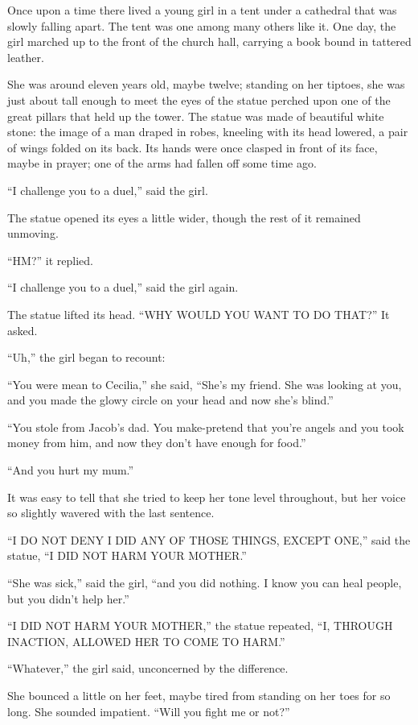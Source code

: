 Once upon a time there lived a young girl in a tent under a cathedral that was slowly falling apart. The tent was one among many others like it. One day, the girl marched up to the front of the church hall, carrying a book bound in tattered leather.

She was around eleven years old, maybe twelve; standing on her tiptoes, she was just about tall enough to meet the eyes of the statue perched upon one of the great pillars that held up the tower. The statue was made of beautiful
white stone: the image of a man draped in robes, kneeling with its head lowered, a pair of wings folded on its back. Its hands were once clasped in front of its face, maybe in prayer; one of the arms had fallen off some time ago.

``I challenge you to a duel,'' said the girl.

The statue opened its eyes a little wider, though the rest of it remained unmoving.

``HM?'' it replied.

``I challenge you to a duel,'' said the girl again.

The statue lifted its head. ``WHY WOULD YOU WANT TO DO THAT?'' It asked.

``Uh,'' the girl began to recount:

``You were mean to Cecilia,'' she said, ``She's my friend. She was looking at you, and you made the glowy circle on your head and now she's blind.''

``You stole from Jacob's dad. You make-pretend that you're angels and you took money from him, and now they don't have enough for food.''

``And you hurt my mum.''

It was easy to tell that she tried to keep her tone level throughout, but her voice so slightly wavered with the last sentence.

``I DO NOT DENY I DID ANY OF THOSE THINGS, EXCEPT ONE,'' said the statue, ``I DID NOT HARM YOUR MOTHER.''

``She was sick,'' said the girl, ``and you did nothing. I know you can heal people, but you didn't help her.''

``I DID NOT HARM YOUR MOTHER,'' the statue repeated, ``I, THROUGH INACTION, ALLOWED HER TO COME TO HARM.''

``Whatever,'' the girl said, unconcerned by the difference.

She bounced a little on her feet, maybe tired from standing on her toes for so long. She sounded impatient. ``Will you fight me or not?''

